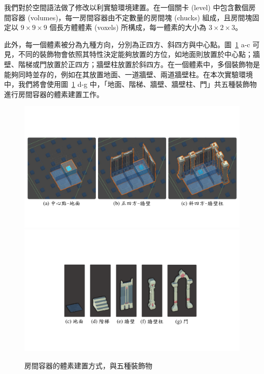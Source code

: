 我們對於空間語法做了修改以利實驗環境建置。在一個關卡 (level) 中包含數個房間容器 (volumes)，每一房間容器由不定數量的房間塊 (chucks) 組成，且房間塊固定以 $9\times 9\times 9$ 個長方體體素 (voxels) 所構成，每一體素的大小為 $3\times 2\times 3$。

此外，每一個體素被分為九種方向，分別為正四方、斜四方與中心點。圖~\ref{fig:decorations-with-directions} a-c 可見，不同的裝飾物會依照其特性決定能夠放置的方位，如地面則放置於中心點；牆壁、階梯或門放置於正四方；牆壁柱放置於斜四方。在一個體素中，多個裝飾物是能夠同時並存的，例如在其放置地面、一道牆壁、兩道牆壁柱。在本次實驗環境中，我們將會使用圖~\ref{fig:decorations-with-directions} d-g 中，「地面、階梯、牆壁、牆壁柱、門」共五種裝飾物進行房間容器的體素建置工作。

\begin{figure}[!htb]
  \begin{center}
    \includegraphics[width=1.0\textwidth]{figures/decorations-with-directions.pdf}
    \includegraphics[width=1.0\textwidth]{figures/decorations-with-directions-.pdf}
    \caption{房間容器的體素建置方式，與五種裝飾物}
    \label{fig:decorations-with-directions}
  \end{center}
\end{figure}

